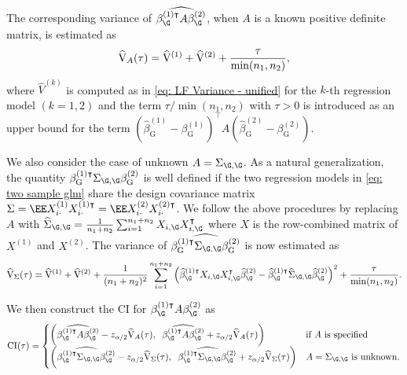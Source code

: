 The corresponding variance of $\widehat{\beta_\G^{(1)\intercal}A\beta_\G^{(2)}}$, when $A$ is a known positive definite matrix, is estimated as
\begin{equation*}
    \widehat{\rm V}_{A}(\tau) = \widehat{\rm V}^{(1)} + \widehat{\rm V}^{(2)} + \frac{\tau}{\min(n_1,n_2)},
\end{equation*}
where $\widehat{V}^{(k)}$ is computed as in \eqref{eq: LF Variance - unified} for the $k$-th regression model $(k = 1,2)$ and the term $\tau/\min(n_1,n_2)$ with $\tau > 0$ is introduced as an upper bound for the term $( \widehat{\beta}_{\textrm{G}}^{(1)} - \beta_{\textrm{G}}^{(1)} )^\intercal A ( \widehat{\beta}_{\textrm{G}}^{(2)} - \beta_{\textrm{G}}^{(2)} )$.

We also consider the case of unknown $A = \Sigma_{\G, \G}$. As a natural generalization, the quantity $\beta_\mathrm{G}^{(1)\intercal} \Sigma_{\G, \G} \beta_\mathrm{G}^{(2)}$ is well defined if the two regression models in \eqref{eq: two sample glm} share the design covariance matrix $\Sigma = \EE X_{i\cdot}^{(1)} X_{i\cdot}^{(1)\intercal} = \EE X_{i\cdot}^{(2)} X_{i\cdot}^{(2)\intercal} $. We follow the above procedures by replacing $A$ with  $\widehat{\Sigma}_{\G,\G} =\frac{1}{n_1 + n_2} \sum_{i=1}^{n_1+n_2} X_{i,\G} X_{i, \G}^\intercal$ where $X$ is the row-combined matrix of $X^{(1)}$ and $X^{(2)}$. The variance of $\widehat{\beta_\mathrm{G}^{(1)\intercal} \Sigma_{\G, \G} \beta_\mathrm{G}^{(2)}}$ is now estimated as 
\begin{equation*}
    \widehat{\rm V}_{\Sigma}(\tau) = \widehat{\rm V}^{(1)} + \widehat{\rm V}^{(2)} + \frac{1}{(n_1 + n_2)^2}\sum_{i=1}^{n_1+n_2} \left(\widehat{\beta}_\G^{(1)\intercal}X_{i,\G}X_{i,\G}^{\intercal}\widehat{\beta}_\G^{(2)} - \widehat{\beta}_\G^{(1)\intercal}\widehat{\Sigma}_{\G,\G}\widehat{\beta}_\G^{(2)}\right)^2 + \frac{\tau}{\min(n_1,n_2)}.
\end{equation*}

We then construct the CI for $\beta_\G^{(1)\intercal}A\beta_\G^{(2)}$ as 
\[
{\rm CI}(\tau) = 
\begin{cases}
\left(\widehat{\beta_\G^{(1)\intercal}A\beta_\G^{(2)}} - z_{\alpha/2}\widehat{\rm V}_A(\tau), \;\; \widehat{\beta_\G^{(1)\intercal}A\beta_\G^{(2)}} + z_{\alpha/2}\widehat{\rm V}_A(\tau)\right) & \textrm{if $A$ is specified}\\
\left(\widehat{\beta_\G^{(1)\intercal}\Sigma_{\G,\G}\beta_\G^{(2)}} - z_{\alpha/2}\widehat{\rm V}_\Sigma(\tau), \;\;\widehat{\beta_\G^{(1)\intercal}\Sigma_{\G,\G}\beta_\G^{(2)}} + z_{\alpha/2}\widehat{\rm V}_\Sigma(\tau)\right) & \textrm{$A=\Sigma_{\G,\G}$ is unknown}.
\end{cases}
\]


